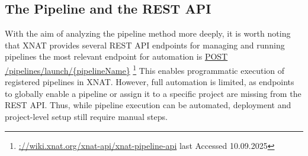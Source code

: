 \subsection{The Pipeline and the REST API}
With the aim of analyzing the pipeline method more deeply, it is worth noting that XNAT provides several REST API endpoints for managing and running pipelines the most relevant endpoint for automation is \url{POST /pipelines/launch/{pipelineName}} \footnote{\url{://wiki.xnat.org/xnat-api/xnat-pipeline-api} last Accessed 10.09.2025}
This enables programmatic execution of registered pipelines in XNAT. However, full automation is limited, as endpoints to globally enable a pipeline or assign it to a specific project are missing from the REST API. Thus, while pipeline execution can be automated, deployment and project-level setup still require manual steps.



